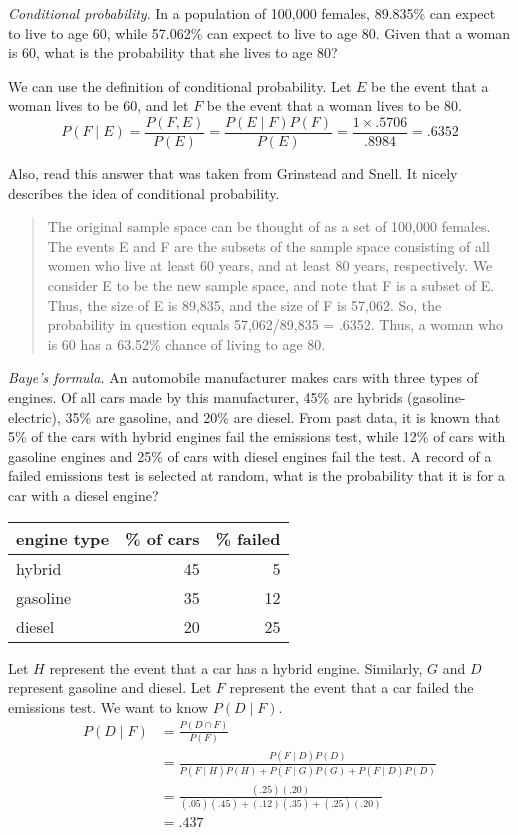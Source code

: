 \emph{Conditional probability}.
In a population of 100,000 females, 89.835\% can expect
to live to age 60, while 57.062\% can expect to live to age
80. Given that a woman is 60, what is the probability that she lives
to age 80?

We can use the definition of conditional
probability. Let $E$ be the event that a woman lives to be 60, and
let $F$ be the event that a woman lives to be 80.
\[
P(F \mid E) = \frac{P(F,E)}{P(E)} = \frac{P(E \mid F)P(F)}{P(E)} = \frac{1 \times .5706}{.8984} = .6352
\]

Also, read this answer that was taken from Grinstead and Snell. It
nicely describes the idea of conditional probability.

\begin{quote}
  The original sample space can be thought of as a set of 100,000
  females. The events E and F are the subsets of the sample space
  consisting of all women who live at least 60 years, and at least 80
  years, respectively. We consider E to be the new sample space, and
  note that F is a subset of E. Thus, the size of E is 89,835, and the
  size of F is 57,062.  So, the probability in question equals
  57,062/89,835 = .6352. Thus, a woman who is 60 has a 63.52\% chance
  of living to age 80.
\end{quote}


\emph{Baye's formula.}
An automobile manufacturer makes cars with three types of
  engines. Of all cars made by this manufacturer, 45\% are hybrids
  (gasoline-electric), 35\% are gasoline, and 20\% are diesel. From
  past data, it is known that 5\% of the cars with hybrid engines fail
  the emissions test, while 12\% of cars with gasoline engines and
  25\% of cars with diesel engines fail the test. A record of a failed
  emissions test is selected at random, what is the probability that
  it is for a car with a diesel engine?
  
\begin{center}
\begin{tabular}{lrr}
    engine type & \% of cars & \% failed \\ \hline
    hybrid & 45 & 5 \\
    gasoline & 35 & 12 \\
    diesel & 20 & 25
\end{tabular}
\end{center}
  Let $H$ represent the event that a car has a hybrid
  engine. Similarly, $G$ and $D$ represent gasoline and diesel. Let
  $F$ represent the event that a car failed the emissions test. We
  want to know $P(D\mid F)$.
\begin{align*}
    P(D\mid F) &= \frac{P(D \cap F)}{P(F)} \\
    &= \frac{P(F \mid D)P(D)}{P(F \mid H)P(H) + P(F \mid G)P(G) + P(F \mid D)P(D)} \\
    &= \frac{(.25)(.20)}{(.05)(.45) + (.12)(.35) + (.25)(.20)} \\
    &= .437
\end{align*}

